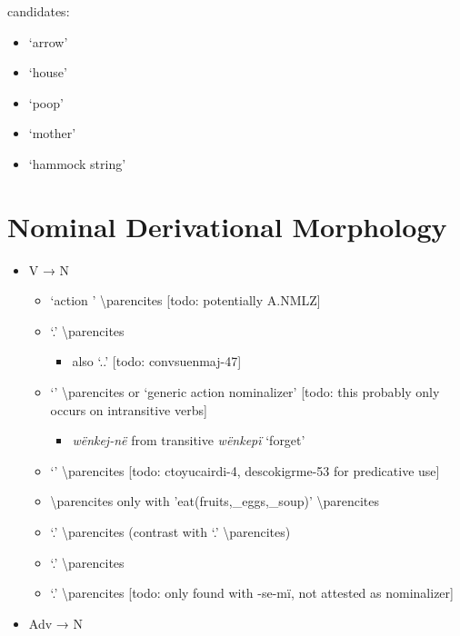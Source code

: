 \documentclass{memoir}
\begin{document}
candidates:

\begin{itemize}
\tightlist
\item
  `arrow'
\item
  `house'
\item
  `poop'
\item
  `mother'
\item
  `hammock string'
\end{itemize}

\section{\texorpdfstring{Nominal Derivational Morphology
\label{sec:nounderiv}}{Nominal Derivational Morphology }}

\begin{itemize}
\tightlist
\item
  V → N

  \begin{itemize}
  \tightlist
  \item
     `action ' \textbackslash parencites {[}todo:
    potentially A.NMLZ{]}
  \item
     `.' \textbackslash parencites

    \begin{itemize}
    \tightlist
    \item
      also `..' {[}todo: convsuenmaj-47{]}
    \end{itemize}
  \item
     `' \textbackslash parencites or `generic action
    nominalizer' {[}todo: this probably only occurs on intransitive
    verbs{]}

    \begin{itemize}
    \tightlist
    \item
      \emph{wënkej-në} from transitive \emph{wënkepï} `forget'
    \end{itemize}
  \item
     `' \textbackslash parencites {[}todo:
    ctoyucairdi-4, descokigrme-53 for predicative use{]}
  \item
     \parencitesV{} \textbackslash parencites only with
     'eat(fruits,\_eggs,\_soup)' \textbackslash parencites
  \item
     `.' \textbackslash parencites (contrast
    with  `.' \textbackslash parencites)
  \item
     `.' \textbackslash parencites
  \item
     `.' \textbackslash parencites {[}todo:
    only found with -se-mï, not attested as nominalizer{]}
  \end{itemize}
\item
  Adv → N


\end{itemize}
\end{document}

